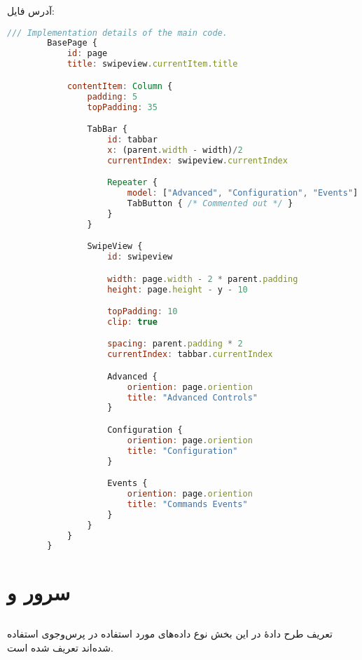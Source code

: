 آدرس فایل:
\hyperref{https://github.com/cardianco/cardian/blob/master/cardian/pages/ExtraPage.qml}{}{}{}
\begin{latin}
	\small
	\begin{lstlisting}[language=qml, caption={ExtraPage.qml}]
		/// Implementation details of the main code.
		BasePage {
			id: page
			title: swipeview.currentItem.title

			contentItem: Column {
				padding: 5
				topPadding: 35

				TabBar {
					id: tabbar
					x: (parent.width - width)/2
					currentIndex: swipeview.currentIndex

					Repeater {
						model: ["Advanced", "Configuration", "Events"]
						TabButton { /* Commented out */ }
					}
				}

				SwipeView {
					id: swipeview

					width: page.width - 2 * parent.padding
					height: page.height - y - 10

					topPadding: 10
					clip: true

					spacing: parent.padding * 2
					currentIndex: tabbar.currentIndex

					Advanced {
						oriention: page.oriention
						title: "Advanced Controls"
					}

					Configuration {
						oriention: page.oriention
						title: "Configuration"
					}

					Events {
						oriention: page.oriention
						title: "Commands Events"
					}
				}
			}
		}
	\end{lstlisting}
\end{latin}

\section{سرور و }

\subsection{}
تعریف طرح دادهٔ 
در این بخش نوع داده‌های مورد استفاده در پرس‌وجوی  استفاده شده‌اند تعریف شده است.

